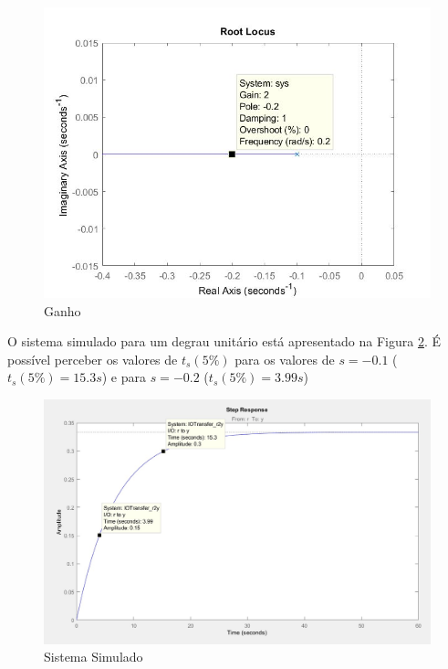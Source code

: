 \documentclass[
]{book}
\theoremstyle{definition}
\theoremstyle{definition}
\theoremstyle{definition}
\theoremstyle{remark}
\begin{document}
\begin{figure}

{\centering \includegraphics{Imagens/Lab8/Resolução/fig2} 

}

\caption{Ganho}\label{fig:fig8R2}
\end{figure}

O sistema simulado para um degrau unitário está apresentado na Figura \ref{fig:fig8R3}. É possível perceber os valores de \(t_s(5\%)\) para os valores de \(s = -0.1\) (\(t_s(5\%) = 15.3s\)) e para \(s = -0.2\) (\(t_s(5\%) = 3.99s\))

\begin{figure}

{\centering \includegraphics{Imagens/Lab8/Resolução/fig3} 

}

\caption{Sistema Simulado}\label{fig:fig8R3}
\end{figure}
\end{document}
